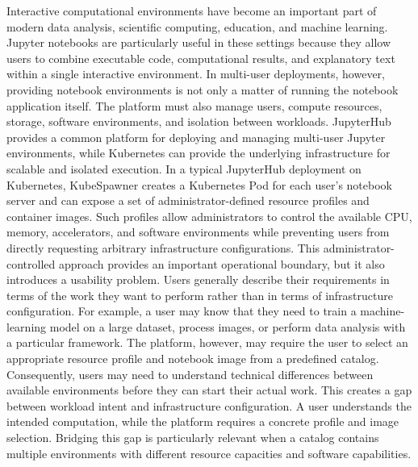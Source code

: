 Interactive computational environments have become an important part of modern data analysis, scientific computing, education, and machine learning. Jupyter notebooks are particularly useful in these settings because they allow users to combine executable code, computational results, and explanatory text within a single interactive environment. In multi-user deployments, however, providing notebook environments is not only a matter of running the notebook application itself. The platform must also manage users, compute resources, storage, software environments, and isolation between workloads. JupyterHub provides a common platform for deploying and managing multi-user Jupyter environments, while Kubernetes can provide the underlying infrastructure for scalable and isolated execution. In a typical JupyterHub deployment on Kubernetes, KubeSpawner creates a Kubernetes Pod for each user's notebook server and can expose a set of administrator-defined resource profiles and container images. Such profiles allow administrators to control the available CPU, memory, accelerators, and software environments while preventing users from directly requesting arbitrary infrastructure configurations. This administrator-controlled approach provides an important operational boundary, but it also introduces a usability problem. Users generally describe their requirements in terms of the work they want to perform rather than in terms of infrastructure configuration. For example, a user may know that they need to train a machine-learning model on a large dataset, process images, or perform data analysis with a particular framework. The platform, however, may require the user to select an appropriate resource profile and notebook image from a predefined catalog. Consequently, users may need to understand technical differences between available environments before they can start their actual work. This creates a gap between workload intent and infrastructure configuration. A user understands the intended computation, while the platform requires a concrete profile and image selection. Bridging this gap is particularly relevant when a catalog contains multiple environments with different resource capacities and software capabilities.

